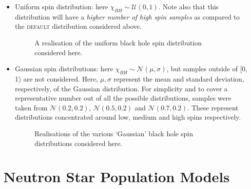         \begin{itemize}

            \item Uniform spin distribution: here $\chi_{BH} \sim \mathcal{U}(0, 1)$.
                Note also that this distribution will have a \emph{higher number of high
                spin samples} as compared to the \textsc{default} distribution
                considered above.

                \begin{figure}[H]
                    \centering
                    \def\svgwidth{0.7\linewidth}
                    
                    \caption[Uniform Black Hole Spin Distribution]{
                        A realisation of the uniform black hole spin distribution
                        considered here.
                    }
                    \label{fig:unif_dist}
                \end{figure}

            \item Gaussian spin distributions: here $\chi_{BH} \sim \mathcal{N}(\mu,
                \sigma)$, but samples outside of [0, 1) are not considered. Here, $\mu,
                \sigma$ represent the mean and standard deviation, respectively, of the
                Gaussian distribution. For simplicity and to cover a representative
                number out of all the possible distributions, samples were taken from
                $\mathcal{N}(0.2, 0.2)$, $\mathcal{N}(0.5, 0.2)$ and $\mathcal{N}(0.7,
                0.2)$. These represent distributions concentrated around low, medium and
                high spins respectively.

                \begin{figure}[H]
                    \centering
                    \def\svgwidth{0.8\linewidth}
                    
                    \caption[Gaussian Black Hole Spin Distributions]{
                        Realisations of the various `Gaussian' black hole spin
                        distributions considered here.
                    }
                    \label{fig:gauss_dists}
                \end{figure}

        \end{itemize}


\section{Neutron Star Population Models}\label{sec:ns_pop}

